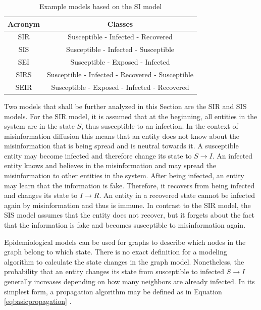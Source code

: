 \begin{table}[ht!]
    \centering
    \begin{tabular}{|c | c |} 
     \hline
     Acronym & Classes  \\ 
     \hline
     SIR & Susceptible - Infected - Recovered  \\ 
     \hline
     SIS & Susceptible - Infected - Susceptible \\
     \hline
     SEI & Susceptible - Exposed - Infected \\
     \hline
     SIRS & Susceptible - Infected - Recovered - Susceptible \\
     \hline
     SEIR & Susceptible - Exposed - Infected - Recovered \\
     \hline
    \end{tabular}
    \caption{Example models based on the SI 
    model  \cite{reviewinformationdiffusion}}
    \label{SI-table}
\end{table}

Two models that shall be further analyzed in this Section are the SIR and SIS models. 
For the SIR model, it is assumed that at the beginning, all entities in the 
system are in the state $S$, thus susceptible to an infection. In the context of 
misinformation diffusion this means that an entity does not know about the
misinformation that is being spread and is neutral towards it. A susceptible
entity may become infected and therefore change its state to $S\to I$.
An infected entity knows and believes in the misinformation and may
spread the misinformation to other entities in the system. After being infected,
an entity may learn that the information is fake. Therefore, it recovers 
from being infected and changes its state to $I\to R$. An entity in a 
recovered state cannot be infected again by misinformation and thus is immune.
In contrast to the SIR model, the SIS model assumes that
the entity does not recover,
but it \glqq forgets\grqq{} about the fact that the information is fake 
and becomes susceptible to misinformation again.

Epidemiological models can be used for graphs to describe which nodes 
in the graph belong to which state.
There is no exact definition for a modeling algorithm to calculate the state 
changes in the graph model. Nonetheless, the probability that an entity changes
its state from susceptible to infected $S \to I$ generally increases depending on
how many neighbors are already infected. In its simplest form, a
propagation algorithm may be defined as in Equation \ref{eqbasicpropagation} 
\cite{easypropagation}.

